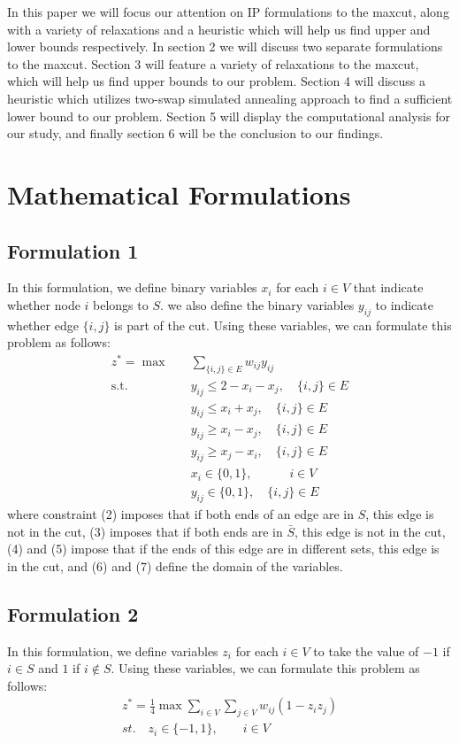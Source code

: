 \documentclass[12pt]{article}
\theoremstyle{plain}
\theoremstyle{definition}
\begin{document}
In this paper we will focus our attention on IP formulations to the maxcut, along with a variety of relaxations and a heuristic which will help us find upper and lower bounds respectively. In section 2 we will discuss two separate formulations to the maxcut. Section 3 will feature a variety of relaxations to the maxcut, which will help us find upper bounds to our problem.  Section 4 will discuss a heuristic which utilizes two-swap simulated annealing approach to find a sufficient lower bound to our problem.  Section 5 will display the computational analysis for our study, and finally section 6 will be the conclusion to our findings.
\section{Mathematical Formulations}\label{sec:Formulations}
\subsection{Formulation 1}\label{subsec:Formulation1}
In this formulation, we define binary variables $x_{i}$ for each $i \in V$ that indicate whether node $i$ belongs to $S$. we also define the binary variables $y_{ij}$ to indicate whether edge $\lbrace i,j \rbrace$ is part of the cut.
Using these variables, we can formulate this problem as follows:
\begin{align}
     z^* = \max \quad &\sum_{\lbrace i,j\rbrace \in E} w_{ij}y_{ij} \\
     \text{s.t.}\quad &y_{ij} \leq 2 - x_i - x_j,\quad \lbrace i,j \rbrace \in E \\
      &y_{ij} \leq x_i + x_j,\quad \lbrace i,j \rbrace \in E \\
       &y_{ij} \geq x_i - x_j,\quad \lbrace i,j \rbrace \in E \\ 
       &y_{ij} \geq x_j - x_i,\quad \lbrace i,j \rbrace \in E \\ 
       &x_i \in \lbrace 0,1 \rbrace, \quad \quad \quad i \in V \\
        &y_{ij} \in \lbrace 0,1 \rbrace, \quad \lbrace i,j \rbrace \in E
\end{align}
where constraint (2) imposes that if both ends of an edge are in $S$, this edge is not in the cut, (3) imposes that if both ends are in $\bar{S}$, this edge is not in the cut, (4) and (5) impose that if the ends of this edge are in different sets, this edge is in the cut, and (6) and (7) define the domain of the variables. 
\subsection{Formulation 2}\label{subsec:Forulation2}
In this formulation, we define variables $z_i$ for each $i \in V$ to take the value of $-1$ if $i \in S$ and $1$ if $i \notin S$. Using these variables, we can formulate this problem as follows:
\begin{align}
     z^* = \frac{1}{4}\max \sum_{i \in V} \sum_{j \in V} w_{ij} (1 - z_i z_j) \\ st.\quad z_i \in \lbrace -1,1 \rbrace, \quad \quad i \in V 
\end{align}
\end{document}

